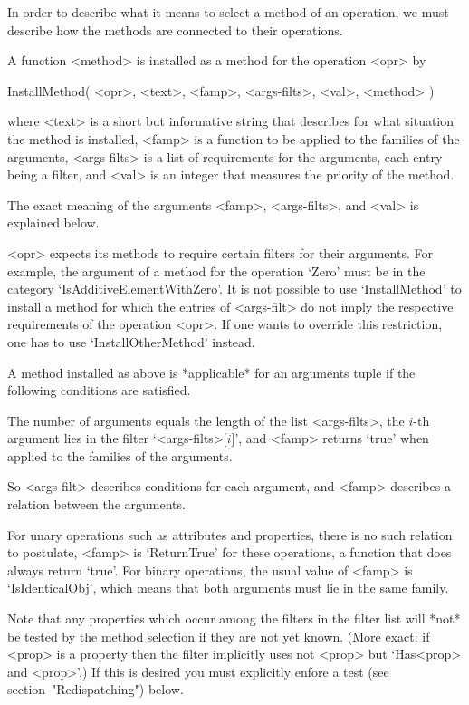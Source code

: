 
In order to describe what it means to select a method of an operation,
we must describe how the methods are connected to their operations.

A function <method> is installed as a method for the operation <opr> by

\>InstallMethod( <opr>, <text>, <famp>, <args-filts>, <val>, <method> )

where <text> is a short but informative string that describes for what
situation the method is installed,
<famp> is a function to be applied to the families of the arguments,
<args-filts> is a list of requirements for the arguments,
each entry being a filter,
and <val> is an integer that measures the priority of the method.

The exact meaning of the arguments <famp>, <args-filts>,
and <val> is explained below.

<opr> expects its methods to require certain filters for their arguments.
For example, the argument of a method for the operation `Zero' must be
in the category `IsAdditiveElementWithZero'.
It is not possible to use `InstallMethod' to install a method for which
the entries of <args-filt> do not imply the respective requirements of
the operation <opr>.
If one wants to override this restriction,
one has to use `InstallOtherMethod' instead.



A method installed as above is *applicable* for an arguments tuple
if the following conditions are satisfied.

The number of arguments equals the length of the list <args-filts>,
the $i$-th argument lies in the filter `<args-filts>[$i$]',
and <famp> returns `true' when applied to the families of the arguments.

So <args-filt> describes conditions for each argument,
and <famp> describes a relation between the arguments.

For unary operations such as attributes and properties,
there is no such relation to postulate,
<famp> is `ReturnTrue' for these operations,
a function that does always return `true'.
For binary operations, the usual value of <famp> is `IsIdenticalObj',
which means that both arguments must lie in the same family.

Note that any properties which occur among the filters in the filter list
will *not* be tested by the method selection if they are not yet known.
(More exact: if <prop> is a property then the filter implicitly uses not
<prop> but `Has<prop> and <prop>'.) If this is desired you must explicitly
enfore a test (see section~"Redispatching") below.

